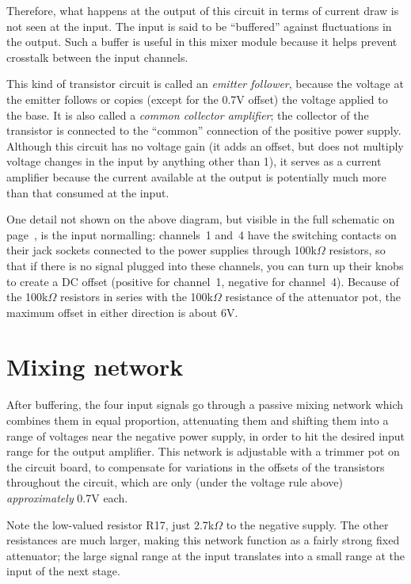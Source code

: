 Therefore, what happens at the output of this circuit in terms of current
draw is not seen at the input.  The input is said to be ``buffered'' against
fluctuations in the output.  Such a buffer is useful in this mixer module
because it helps prevent crosstalk between the input channels.

This kind of transistor circuit is called an \emph{emitter follower},
because the voltage at the emitter follows or copies (except for the 0.7V
offset) the voltage applied to the base.  It is also called a
\emph{common collector amplifier}; the collector of the transistor is
connected to the ``common'' connection of the positive power supply. 
Although this circuit has no voltage gain (it adds an offset, but does not
multiply voltage changes in the input by anything other than 1), it serves
as a current amplifier because the current available at the output is
potentially much more than that consumed at the input.

One detail not shown on the above diagram, but visible in the full schematic
on page~\pageref{fig:schematic}, is the input normalling:  channels~1 and~4
have the switching contacts on their jack sockets connected to the power
supplies through 100k$\Omega$ resistors, so that if there is no signal
plugged into these channels, you can turn up their knobs to create a DC
offset (positive for channel~1, negative for channel~4).  Because of the
100k$\Omega$ resistors in series with the 100k$\Omega$ resistance of the
attenuator pot, the maximum offset in either direction is about 6V.

\section{Mixing network}

After buffering, the four input signals go through a passive mixing network
which combines them in equal proportion, attenuating them and shifting them
into a range of voltages near the negative power supply, in order to hit the
desired input range for the output amplifier.  This network is adjustable
with a trimmer pot on the circuit board, to compensate for variations in the
offsets of the transistors throughout the circuit, which are only (under the
voltage rule above) \emph{approximately} 0.7V each.

{\centering\par}

Note the low-valued resistor R17, just 2.7k$\Omega$ to the negative supply. 
The other resistances are much larger, making this network function as a
fairly strong fixed attenuator; the large signal range at the input
translates into a small range at the input of the next stage.

